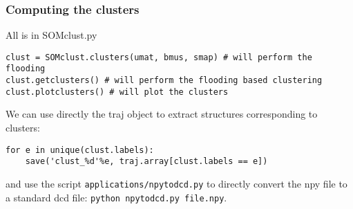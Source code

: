 \begin{frame}[fragile]
    \frametitle{Computing the clusters}
    All is in SOMclust.py
    \begin{lstlisting}
clust = SOMclust.clusters(umat, bmus, smap) # will perform the flooding
clust.getclusters() # will perform the flooding based clustering
clust.plotclusters() # will plot the clusters
    \end{lstlisting}
    We can use directly the traj object to extract structures corresponding to clusters:
    \begin{lstlisting}
for e in unique(clust.labels):
    save('clust_%d'%e, traj.array[clust.labels == e])
    \end{lstlisting}
    and use the script \texttt{applications/npytodcd.py} to directly convert the npy file to a standard dcd file: \lstinline{python npytodcd.py file.npy}.
\end{frame}
